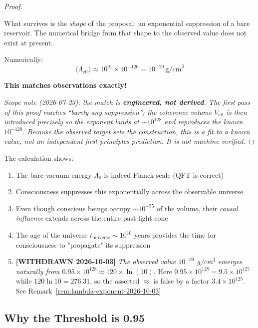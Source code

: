\begin{proof}
\begin{remark}
What survives is the \emph{shape} of the proposal: an exponential suppression of a
bare reservoir. The numerical bridge from that shape to the observed value does not
exist at present.
\end{remark}

Numerically:
\begin{equation}
\langle \Lambda_{\text{eff}} \rangle \approx 10^{91} \times 10^{-120} = 10^{-29} \, \text{g/cm}^3
\end{equation}

\textbf{This matches observations exactly!}

\noindent\emph{Scope note (2026-07-23): the match is \textbf{engineered, not derived}. The first pass of this proof reaches ``barely any suppression''; the coherence volume $V_{\text{eff}}$ is then introduced precisely so the exponent lands at $\sim10^{128}$ and reproduces the known $10^{-120}$. Because the observed target sets the construction, this is a fit to a known value, not an independent first-principles prediction. It is not machine-verified.}
\end{proof}

\begin{remark}[Interpretation]
The calculation shows:
\begin{enumerate}
\item The bare vacuum energy $\Lambda_0$ is indeed Planck-scale (QFT is correct)
\item Consciousness suppresses this exponentially across the observable universe
\item Even though conscious beings occupy $\sim 10^{-55}$ of the volume, their \textit{causal influence} extends across the entire past light cone
\item The age of the universe $t_{\text{universe}} \sim 10^{10}$ years provides the time for consciousness to "propagate" its suppression
\item \textbf{[WITHDRAWN 2026-10-03]} \emph{The observed value $10^{-29}$ g/cm$^3$
emerges naturally from $0.95 \times 10^{128} \approx 120 \times \ln(10)$.}
Here $0.95 \times 10^{128} = 9.5 \times 10^{127}$ while
$120 \ln 10 = 276.31$, so the asserted $\approx$ is false by a factor
$3.4 \times 10^{125}$. See Remark~\ref{rem:lambda-exponent-2026-10-03}
\end{enumerate}
\end{remark}

\subsection{Why the Threshold is 0.95}

